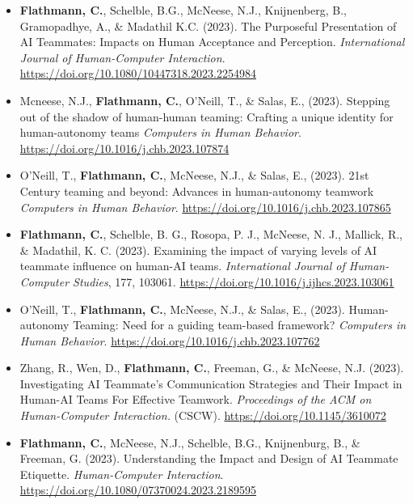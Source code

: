 \begin{itemize}[align=left, labelwidth=3em,]
\item[JA.10] \textbf{Flathmann, C.}, Schelble, B.G., McNeese, N.J., Knijnenberg, B., Gramopadhye, A., \& Madathil K.C. (2023). The Purposeful Presentation of AI Teammates: Impacts on Human Acceptance and Perception. \textit{International Journal of Human-Computer Interaction}. \url{https://doi.org/10.1080/10447318.2023.2254984}\\

\item[JA.9] Mcneese, N.J., \textbf{Flathmann, C.}, O'Neill, T., \& Salas, E., (2023). Stepping out of the shadow of human-human teaming: Crafting a unique identity for human-autonomy teams \textit{Computers in Human Behavior}. \url{https://doi.org/10.1016/j.chb.2023.107874}\\

\item[JA.8] O'Neill, T., \textbf{Flathmann, C.}, McNeese, N.J., \& Salas, E., (2023). 21st Century teaming and beyond: Advances in human-autonomy teamwork \textit{Computers in Human Behavior}. \url{https://doi.org/10.1016/j.chb.2023.107865}\\

\item[JA.7] \textbf{Flathmann, C.}, Schelble, B. G., Rosopa, P. J., McNeese, N. J., Mallick, R., \& Madathil, K. C. (2023). Examining the impact of varying levels of AI teammate influence on human-AI teams. \textit{International Journal of Human-Computer Studies}, 177, 103061. \url{https://doi.org/10.1016/j.ijhcs.2023.103061} \\

\item[JA.6] O'Neill, T., \textbf{Flathmann, C.}, McNeese, N.J., \& Salas, E., (2023). Human-autonomy Teaming: Need for a guiding team-based framework? \textit{Computers in Human Behavior}. \url{https://doi.org/10.1016/j.chb.2023.107762}\\

\item[JA.5] Zhang, R., Wen, D., \textbf{Flathmann, C.}, Freeman, G., \& McNeese, N.J. (2023). Investigating AI Teammate’s Communication Strategies and Their Impact in Human-AI Teams For Effective Teamwork. \textit{Proceedings of the ACM on Human-Computer Interaction.} (CSCW). \url{https://doi.org/10.1145/3610072} \\

\item[JA.4] \textbf{Flathmann, C.}, McNeese, N.J., Schelble, B.G., Knijnenburg, B., \& Freeman, G. (2023). Understanding the Impact and Design of AI Teammate Etiquette. \textit{Human-Computer Interaction}. \url{https://doi.org/10.1080/07370024.2023.2189595}\\


\end{itemize}
